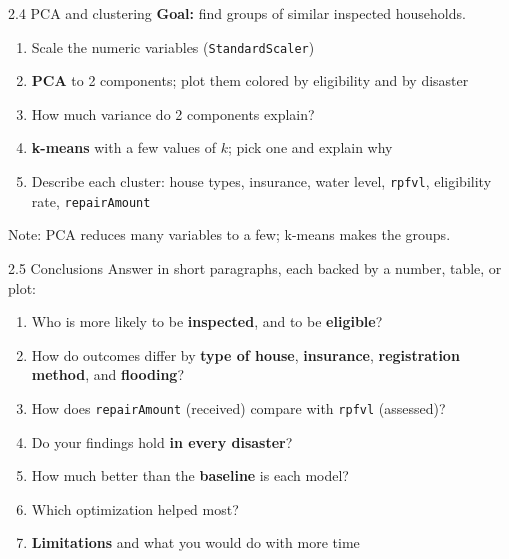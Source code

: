 \documentclass[aspectratio=43,11pt]{beamer}
\begin{document}
\begin{frame}{2.4 PCA and clustering}
  \textbf{Goal:} find groups of similar inspected households.
  \vspace{0.4em}
  \begin{enumerate}
    \item Scale the numeric variables (\texttt{StandardScaler})
    \item \textbf{PCA} to 2 components; plot them colored by eligibility
          and by disaster
    \item How much variance do 2 components explain?
    \item \textbf{k-means} with a few values of $k$; pick one and explain why
    \item Describe each cluster: house types, insurance, water level,
          \texttt{rpfvl}, eligibility rate, \texttt{repairAmount}
  \end{enumerate}
  \vspace{0.4em}
  \small Note: PCA reduces many variables to a few; k-means makes the groups.
\end{frame}

\begin{frame}{2.5 Conclusions}
  Answer in short paragraphs, each backed by a number, table, or plot:
  \vspace{0.5em}
  \begin{enumerate}
    \item Who is more likely to be \textbf{inspected}, and to be
          \textbf{eligible}?
    \item How do outcomes differ by \textbf{type of house}, \textbf{insurance},
          \textbf{registration method}, and \textbf{flooding}?
    \item How does \texttt{repairAmount} (received) compare with
          \texttt{rpfvl} (assessed)?
    \item Do your findings hold \textbf{in every disaster}?
    \item How much better than the \textbf{baseline} is each model?
    \item Which optimization helped most?
    \item \textbf{Limitations} and what you would do with more time
  \end{enumerate}
\end{frame}
\end{document}
